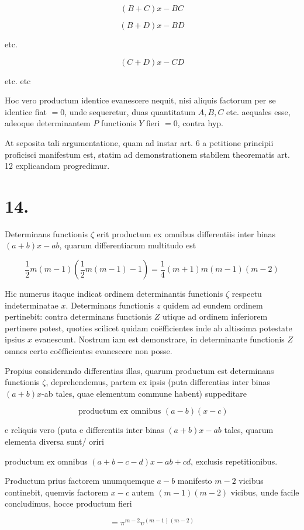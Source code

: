 \documentclass[10pt]{article}
\begin{document}
\[
(B+C) x-B C
\]

\[
(B+D) x-B D
\]

etc.

\[
(C+D) x-C D
\]

etc. etc

Hoc vero productum identice evanescere nequit, nisi aliquis factorum per se identice fiat \(=0\), unde sequeretur, duas quantitatum \(A, B, C\) etc. aequales esse, adeoque determinantem \(P\) functionis \(Y\) fieri \(=0\), contra hyp.

At seposita tali argumentatione, quam ad instar art. 6 a petitione principii proficisci manifestum est, statim ad demonstrationem stabilem theorematis art. 12 explicandam progredimur.

\section*{14.}
Determinans functionis \(\zeta\) erit productum ex omnibus differentiis inter binas \((a+b) x-a b\), quarum differentiarum multitudo est

\[
\frac{1}{2} m(m-1)\left(\frac{1}{2} m(m-1)-1\right)=\frac{1}{4}(m+1) m(m-1)(m-2)
\]

Hic numerus itaque indicat ordinem determinantis functionis \(\zeta\) respectu indeterminatae \(x\). Determinans functionis \(z\) quidem ad eundem ordinem pertinebit: contra determinans functionis \(Z\) utique ad ordinem inferiorem pertinere potest, quoties scilicet quidam coëfficientes inde ab altissima potestate ipsius \(x\) evanescunt. Nostrum iam est demonstrare, in determinante functionis \(Z\) omnes certo coëfficientes evanescere non posse.

Propius considerando differentias illas, quarum productum est determinans functionis \(\zeta\), deprehendemus, partem ex ipsis (puta differentias inter binas \((a+b) x\)-ab tales, quae elementum commune habent) suppeditare

\[
\text { productum ex omnibus }(a-b)(x-c)
\]

e reliquis vero (puta e differentiis inter binas \((a+b) x-a b\) tales, quarum elementa diversa sunt/ oriri

productum ex omnibus \((a+b-c-d) x-a b+c d\), exclusis repetitionibus.

Productum prius factorem unumquemque \(a-b\) manifesto \(m-2\) vicibus continebit, quemvis factorem \(x-c\) autem \((m-1)(m-2)\) vicibus, unde facile concludimus, hocce productum fieri

\[
=\pi^{m-2} v^{(m-1)(m-2)}
\]
\end{document}

